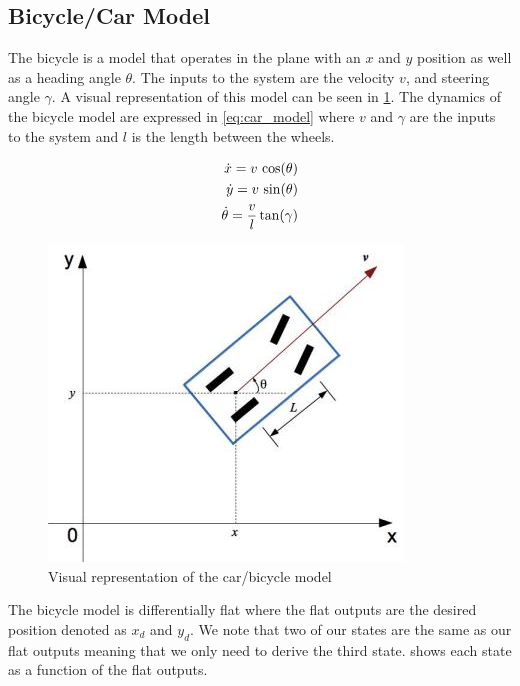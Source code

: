 \documentclass{article}
\begin{document}
\subsection{Bicycle/Car Model}

The bicycle is a model that operates in the plane with an $x$ and $y$ position as well as a 
heading angle $\theta$. The inputs to the system are the velocity $v$, and steering angle $\gamma$.
A visual representation of this model can be seen in \cref{fig:bicycle_model}.
The dynamics of the bicycle model are expressed in \cref{eq:car_model} where $v$ and $\gamma$
are the inputs to the system and $l$ is the length between the wheels.

\begin{equation}
  \centering
\begin{aligned}
  \dot{x} = v\,\cos(\theta) \\
  \dot{y} = v\,\sin(\theta) \\
  \dot{\theta} = \frac{v}{l}\tan(\gamma)
\end{aligned}
\label{eq:car_model}
\end{equation}

\begin{figure}[bth]
  \centering
  \includegraphics[scale=0.5]{car_model.jpg}
  \caption{Visual representation of the car/bicycle model\label{fig:bicycle_model}}
\end{figure}

The bicycle model is differentially flat where the flat outputs are the desired position denoted as 
$x_d$ and $y_d$. We note that two of our states are the same as our flat outputs meaning that we only
need to derive the third state.  shows each state as a function of the flat outputs.
\end{document}

